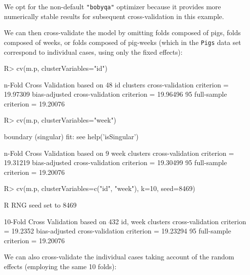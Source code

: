 \documentclass[
]{jss}
\begin{document}
We opt for the non-default \texttt{"bobyqa"} optimizer because it
provides more numerically stable results for subsequent cross-validation
in this example.

We can then cross-validate the model by omitting folds composed of pigs,
folds composed of weeks, or folds composed of pig-weeks (which in the
\texttt{Pigs} data set correspond to individual cases, using only the
fixed effects):

\begin{CodeChunk}
\begin{CodeInput}
R> cv(m.p, clusterVariables="id")
\end{CodeInput}
\begin{CodeOutput}
n-Fold Cross Validation based on 48 {id} clusters
cross-validation criterion = 19.97309
bias-adjusted cross-validation criterion = 19.96496
95%
full-sample criterion = 19.20076 
\end{CodeOutput}
\begin{CodeInput}
R> cv(m.p, clusterVariables="week")
\end{CodeInput}
\begin{CodeOutput}
boundary (singular) fit: see help('isSingular')
\end{CodeOutput}
\begin{CodeOutput}
n-Fold Cross Validation based on 9 {week} clusters
cross-validation criterion = 19.31219
bias-adjusted cross-validation criterion = 19.30499
95%
full-sample criterion = 19.20076 
\end{CodeOutput}
\begin{CodeInput}
R> cv(m.p, clusterVariables=c("id", "week"), k=10, seed=8469)
\end{CodeInput}
\begin{CodeOutput}
R RNG seed set to 8469
\end{CodeOutput}
\begin{CodeOutput}
10-Fold Cross Validation based on 432 {id, week} clusters
cross-validation criterion = 19.2352
bias-adjusted cross-validation criterion = 19.23294
95%
full-sample criterion = 19.20076 
\end{CodeOutput}
\end{CodeChunk}

We can also cross-validate the individual cases taking account of the
random effects (employing the same 10 folds):
\end{document}
